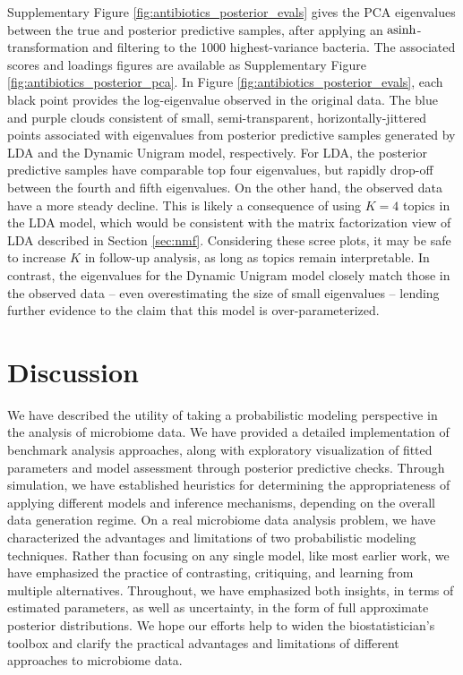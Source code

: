 \documentclass[oupdraft]{bio}
\begin{document}
Supplementary Figure \ref{fig:antibiotics_posterior_evals} gives the PCA
eigenvalues between the true and posterior predictive samples, after applying an
$\mathop\mathrm{asinh}$-transformation and filtering to the 1000 highest-variance bacteria. The
associated scores and loadings figures are available as Supplementary Figure
\ref{fig:antibiotics_posterior_pca}. In Figure
\ref{fig:antibiotics_posterior_evals}, each black point provides the
log-eigenvalue observed in the original data. The blue and purple clouds
consistent of small, semi-transparent, horizontally-jittered points associated
with eigenvalues from posterior predictive samples generated by LDA and the
Dynamic Unigram model, respectively. For LDA, the posterior predictive samples
have comparable top four eigenvalues, but rapidly drop-off between the fourth
and fifth eigenvalues. On the other hand, the observed data have a more steady
decline. This is likely a consequence of using $K = 4$ topics in the LDA model,
which would be consistent with the matrix factorization view of LDA described in
Section \ref{sec:nmf}. Considering these scree plots, it may be safe to increase
$K$ in follow-up analysis, as long as topics remain interpretable. In contrast,
the eigenvalues for the Dynamic Unigram model closely match those in the
observed data -- even overestimating the size of small eigenvalues -- lending
further evidence to the claim that this model is over-parameterized.

\section{Discussion}
We have described the utility of taking a probabilistic modeling perspective in
the analysis of microbiome data. We have provided a detailed implementation of
benchmark analysis approaches, along with exploratory visualization of fitted
parameters and model assessment through posterior predictive checks. Through
simulation, we have established heuristics for determining the appropriateness
of applying different models and inference mechanisms, depending on the overall
data generation regime. On a real microbiome data analysis problem, we have
characterized the advantages and limitations of two probabilistic modeling
techniques. Rather than focusing on any single model, like most earlier work, we
have emphasized the practice of contrasting, critiquing, and learning from
multiple alternatives. Throughout, we have emphasized both insights, in terms of
estimated parameters, as well as uncertainty, in the form of full approximate
posterior distributions. We hope our efforts help to widen the biostatistician's
toolbox and clarify the practical advantages and limitations of different
approaches to microbiome data.
\end{document}
